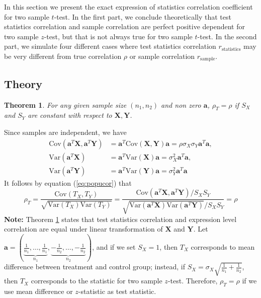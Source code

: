 \documentclass[12pt, a4paper]{article}
\newtheorem{theorem}{Theorem}       %
\newcommand{\cov}{\text{Cov}}
\newcommand{\var}{\text{Var}}
\begin{document}
	In this section we present the exact expression of statistics correlation coefficient for two
	sample $t$-test. In the first part, we conclude theoretically that test statistics correlation and
	sample correlation are perfect positive dependent for two sample $z$-test, but that is not always
	true for two sample $t$-test. In the second part, we simulate four different cases where test
	statistics correlation $r_{\text{statistics}}$ may be very different from true correlation $\rho$ or
	sample correlation $r_{\text{sample}}$. 
	\subsection{Theory}
	\begin{theorem}\label{thm:lineartransformation} 
		For any given sample size $(n_1, n_2)$ and non zero $\bm a$, $\rho_T=\rho$ if $S_X$ and $S_Y$ are constant with respect to $\bm X, \bm Y$. 
	\end{theorem}
	 Since samples are independent, we have 
	\begin{equation}
	\begin{aligned}
		\cov(\bm a^T\bm X, \bm a^T\bm Y) &= \bm a^T \cov(\bm X, \bm Y)\bm a  = \rho\sigma_X\sigma_Y\bm a^T\bm a, \\
		\var(\bm a^T\bm X)& = \bm a^T\var(\bm X)\bm a   = \sigma_X^2\bm a^T\bm a, \\
		\var(\bm a^T\bm Y)& = \bm a^T\var(\bm Y)\bm a   = \sigma_Y^2\bm a^T\bm a 
	\end{aligned}
	\end{equation}
	It follows by equation (\ref{eq:popucor}) that
	\begin{equation}
	\rho_T = \dfrac{\cov(T_X, T_Y)}{\sqrt{\var(T_X)\var(T_Y)}} = \dfrac{	\cov(\bm a^T\bm X, \bm a^T\bm Y)/S_XS_Y}{\sqrt{\var(\bm a^T\bm X)\var(\bm a^T\bm Y)}/S_XS_Y} = \rho
	\end{equation}
	\textbf{Note:} Theorem \ref{thm:lineartransformation} states that test statistics correlation and expression level correlation are equal under linear transformation of $\bm X$ and $\bm Y$. Let $\bm a  = (\underbrace{\frac{1}{n_1}, \ldots, \frac{1}{n_1}}_{n_1}, \underbrace{-\frac{1}{n_2}, \ldots, -\frac{1}{n_2}}_{n_2})$, and if we set $S_X=1$, then $T_X$ corresponds to mean difference between treatment and control group; instead, if $S_X = \sigma_X\sqrt{\frac{1}{n_1} + \frac{1}{n_2}}$, then $T_X$ corresponds to the statistic for two sample $z$-test. Therefore, $\rho_T=\rho$ if we use mean difference or $z$-statistic as test statistic.
	
\end{document}
